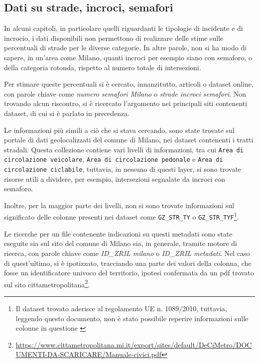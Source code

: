\documentclass[a4paper,12pt]{report}
\newcommand{\columnstyle}[1]{\texttt{#1}}
\newcommand{\quotestyle}[1]{\textit{#1}}
\begin{document}
\subsection{Dati su strade, incroci, semafori}

In alcuni capitoli, in particolare quelli riguardanti le tipologie di incidente e 
di incrocio, i dati disponibili non permettono di realizzare delle stime sulle 
percentuali di strade per le diverse categorie. 
In altre parole, non si ha modo di sapere, in un'area come Milano, quanti incroci 
per esempio siano con semaforo, o della categoria rotonda, 
rispetto al numero totale di intersezioni. 

Per stimare queste percentuali si è cercato, innanzitutto, articoli o dataset online, con 
parole chiave come \quotestyle{numero semafori Milano} o \quotestyle{strade incroci semafori}.
Non trovando alcun riscontro, si è ricercato l'argomento nei principali siti contenenti 
dataset, di cui si è parlato in precedenza. 

Le informazioni più simili a ciò che si stava cercando, 
sono state trovate sul portale di dati geolocalizzati 
del comune di Milano, nei dataset contenenti i tratti stradali.
Questa collezione contiene vari livelli di informazioni, tra cui 
\columnstyle{Area di circolazione veicolare}, 
\columnstyle{Area di circolazione pedonale} e \columnstyle{Area di circolazione ciclabile}, 
tuttavia, in nessuno di questi layer, si sono trovate risorse utili a dividere, 
per esempio, intersezioni segnalate da incroci con semaforo. 

Inoltre, per la maggior parte dei livelli, non si sono trovate informazioni sul significato 
delle colonne presenti nei dataset come \columnstyle{GZ\_STR\_TY} o 
\columnstyle{GZ\_STR\_TYF}\footnote{Il dataset trovato aderisce al regolamento UE n. 1089/2010, 
tuttavia, leggendo questo documento, non è stato possibile reperire informazioni sulle colonne 
in questione \cite{REGOLAMENTOUE:1}}. 

Le ricerche per un file contenente indicazioni su questi metadati sono state eseguite sia 
sul sito del comune di Milano sia, in generale, tramite motore di ricerca, con parole chiave 
come \quotestyle{ID\_ZRIL milano} o \quotestyle{ID\_ZRIL metadati}. 
Nel caso di quest'ultimo, si è ipotizzato, tracciando una parte dei valori della colonna, 
che fosse un identificatore univoco del territorio, ipotesi confermata 
da un pdf trovato sul sito 
cittametropolitana\footnote{\url{https://www.cittametropolitana.mi.it/export/sites/default/DeCiMetro/DOCUMENTI-DA-SCARICARE/Manuale-civici.pdf}}. 
\end{document}
